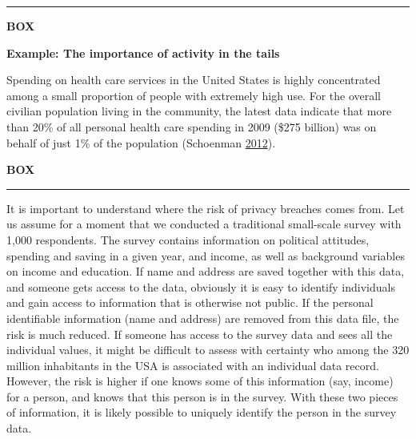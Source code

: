 \documentclass[]{krantz}
\begin{document}
\begin{center}\rule{0.5\linewidth}{\linethickness}\end{center}

\textbf{BOX}

\textbf{Example: The importance of activity in the tails}

Spending on health care services in the United States is highly
concentrated among a small proportion of people with extremely high use.
For the overall civilian population living in the community, the latest
data indicate that more than 20\% of all personal health care spending
in 2009 (\$275 billion) was on behalf of just 1\% of the population
(Schoenman \protect\hyperlink{ref-healthcarespending}{2012}).

\textbf{BOX}

\begin{center}\rule{0.5\linewidth}{\linethickness}\end{center}

It is important to understand where the risk of privacy breaches comes
from. Let us assume for a moment that we conducted a traditional
small-scale survey with 1,000 respondents. The survey contains
information on political attitudes, spending and saving in a given year,
and income, as well as background variables on income and education. If
name and address are saved together with this data, and someone gets
access to the data, obviously it is easy to identify individuals and
gain access to information that is otherwise not public. If the personal
identifiable information (name and address) are removed from this data
file, the risk is much reduced. If someone has access to the survey data
and sees all the individual values, it might be difficult to assess with
certainty who among the 320 million inhabitants in the USA is associated
with an individual data record. However, the risk is higher if one knows
some of this information (say, income) for a person, and knows that this
person is in the survey. With these two pieces of information, it is
likely possible to uniquely identify the person in the survey data.
\end{document}
